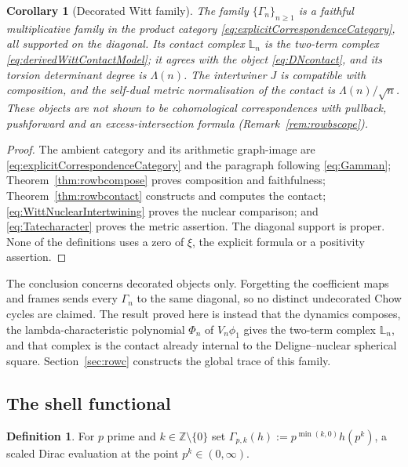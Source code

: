 \documentclass[11pt]{amsart}
\newtheorem{corollary}[theorem]{Corollary}
\theoremstyle{definition}
\newtheorem{definition}[theorem]{Definition}
\theoremstyle{remark}
\newcommand{\Z}{\mathbb Z}
\begin{document}
\begin{corollary}[Decorated Witt family]\label{cor:rowb}
The family $\{\Gamma_n\}_{n\ge1}$ is a faithful multiplicative family in the
product category \eqref{eq:explicitCorrespondenceCategory}, all supported on
the diagonal.  Its contact complex $\mathbb L_n$ is the two-term complex
\eqref{eq:derivedWittContactModel}; it agrees with the object
\eqref{eq:DNcontact}, and its torsion determinant degree is $\Lambda(n)$.
The intertwiner $J$ is compatible with composition, and the self-dual metric
normalisation of the contact is $\Lambda(n)/\sqrt n$.  These objects are not
shown to be cohomological correspondences with pullback, pushforward and an
excess-intersection formula (Remark~\ref{rem:rowbscope}).
\end{corollary}

\begin{proof}
The ambient category and its arithmetic graph-image are
\eqref{eq:explicitCorrespondenceCategory} and the paragraph following
\eqref{eq:Gamman};
Theorem~\ref{thm:rowbcompose} proves composition and faithfulness;
Theorem~\ref{thm:rowbcontact} constructs and computes the contact;
\eqref{eq:WittNuclearIntertwining} proves the nuclear comparison; and
\eqref{eq:Tatecharacter} proves the metric assertion.  The diagonal support
is proper.  None of the definitions uses a zero of $\xi$, the explicit
formula or a positivity assertion.
\end{proof}

The conclusion concerns decorated objects only.  Forgetting the coefficient
maps and frames sends every $\Gamma_n$ to the same diagonal, so no distinct
undecorated Chow cycles are claimed.  The result proved here is instead
that the dynamics composes, the lambda-characteristic polynomial $\Phi_n$ of $V_n\phi_1$ gives the two-term complex $\mathbb L_n$, and that complex is the contact already internal to the
Deligne--nuclear spherical square.  Section~\ref{sec:rowc} constructs the
global trace of this family.



\subsection{The shell functional}

\begin{definition}
For $p$ prime and $k\in\Z\setminus\{0\}$ set
$\Gamma_{p,k}(h):=p^{\min(k,0)}h(p^{k})$, a scaled Dirac evaluation at the
point $p^{k}\in(0,\infty)$.
\end{definition}
\end{document}
